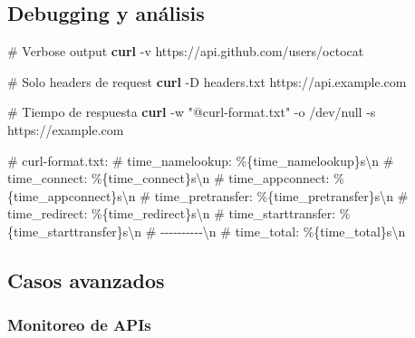 \documentclass[
  11pt,
  letterpaper,
  oneside,
  openany]{scrbook}
\newenvironment{Shaded}{}{}
\newcommand{\AttributeTok}[1]{\textcolor[rgb]{0.84,0.23,0.29}{#1}}
\newcommand{\CommentTok}[1]{\textcolor[rgb]{0.42,0.45,0.49}{#1}}
\newcommand{\ExtensionTok}[1]{\textcolor[rgb]{0.84,0.23,0.29}{\textbf{#1}}}
\newcommand{\NormalTok}[1]{\textcolor[rgb]{0.14,0.16,0.18}{#1}}
\newcommand{\StringTok}[1]{\textcolor[rgb]{0.01,0.18,0.38}{#1}}
\begin{document}
\subsection{Debugging y análisis}\label{debugging-y-anuxe1lisis}

\begin{Shaded}
\begin{Highlighting}[]
\CommentTok{\# Verbose output}
\ExtensionTok{curl} \AttributeTok{{-}v}\NormalTok{ https://api.github.com/users/octocat}

\CommentTok{\# Solo headers de request}
\ExtensionTok{curl} \AttributeTok{{-}D}\NormalTok{ headers.txt https://api.example.com}

\CommentTok{\# Tiempo de respuesta}
\ExtensionTok{curl} \AttributeTok{{-}w} \StringTok{"@curl{-}format.txt"} \AttributeTok{{-}o}\NormalTok{ /dev/null }\AttributeTok{{-}s}\NormalTok{ https://example.com}

\CommentTok{\# curl{-}format.txt:}
\CommentTok{\#      time\_namelookup:  \%\{time\_namelookup\}s\textbackslash{}n}
\CommentTok{\#         time\_connect:  \%\{time\_connect\}s\textbackslash{}n}
\CommentTok{\#      time\_appconnect:  \%\{time\_appconnect\}s\textbackslash{}n}
\CommentTok{\#     time\_pretransfer:  \%\{time\_pretransfer\}s\textbackslash{}n}
\CommentTok{\#        time\_redirect:  \%\{time\_redirect\}s\textbackslash{}n}
\CommentTok{\#   time\_starttransfer:  \%\{time\_starttransfer\}s\textbackslash{}n}
\CommentTok{\#                     {-}{-}{-}{-}{-}{-}{-}{-}{-}{-}\textbackslash{}n}
\CommentTok{\#           time\_total:  \%\{time\_total\}s\textbackslash{}n}
\end{Highlighting}
\end{Shaded}

\subsection{Casos avanzados}\label{casos-avanzados-2}

\subsubsection{Monitoreo de APIs}\label{monitoreo-de-apis}
\end{document}

